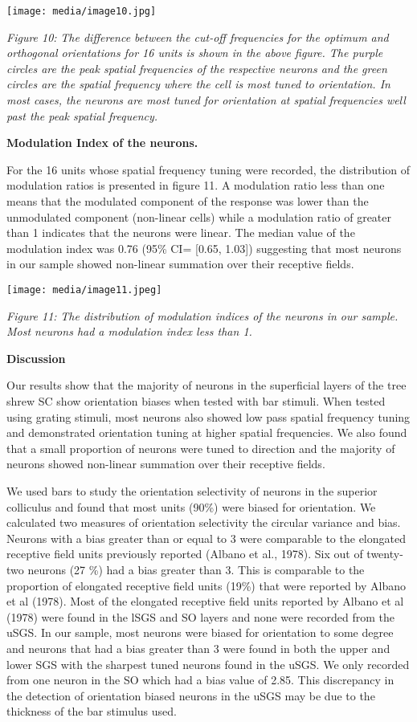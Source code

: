 \texttt{[image: media/image10.jpg]}

\emph{Figure 10:} \emph{The difference between the cut-off frequencies
for the optimum and orthogonal orientations for 16 units is shown in the
above figure. The purple circles are the peak spatial frequencies of the
respective neurons and the green circles are the spatial frequency where
the cell is most tuned to orientation. In most cases, the neurons are
most tuned for orientation at spatial frequencies well past the peak
spatial frequency.}

\textbf{Modulation Index of the neurons.}

For the 16 units whose spatial frequency tuning were recorded, the
distribution of modulation ratios is presented in figure 11. A
modulation ratio less than one means that the modulated component of the
response was lower than the unmodulated component (non-linear cells)
while a modulation ratio of greater than 1 indicates that the neurons
were linear. The median value of the modulation index was 0.76 (95\% CI=
{[}0.65, 1.03{]}) suggesting that most neurons in our sample showed
non-linear summation over their receptive fields.

\texttt{[image: media/image11.jpeg]}

\emph{Figure 11:} \emph{The distribution of modulation indices of the
neurons in our sample. Most neurons had a modulation index less than 1.}

\textbf{Discussion}

Our results show that the majority of neurons in the superficial layers
of the tree shrew SC show orientation biases when tested with bar
stimuli. When tested using grating stimuli, most neurons also showed low
pass spatial frequency tuning and demonstrated orientation tuning at
higher spatial frequencies. We also found that a small proportion of
neurons were tuned to direction and the majority of neurons showed
non-linear summation over their receptive fields.

We used bars to study the orientation selectivity of neurons in the
superior colliculus and found that most units (90\%) were biased for
orientation. We calculated two measures of orientation selectivity the
circular variance and bias. Neurons with a bias greater than or equal to
3 were comparable to the elongated receptive field units previously
reported (Albano et al., 1978). Six out of twenty-two neurons (27 \%)
had a bias greater than 3. This is comparable to the proportion of
elongated receptive field units (19\%) that were reported by Albano et
al (1978). Most of the elongated receptive field units reported by
Albano et al (1978) were found in the lSGS and SO layers and none were
recorded from the uSGS. In our sample, most neurons were biased for
orientation to some degree and neurons that had a bias greater than 3
were found in both the upper and lower SGS with the sharpest tuned
neurons found in the uSGS. We only recorded from one neuron in the SO
which had a bias value of 2.85. This discrepancy in the detection of
orientation biased neurons in the uSGS may be due to the thickness of
the bar stimulus used.

